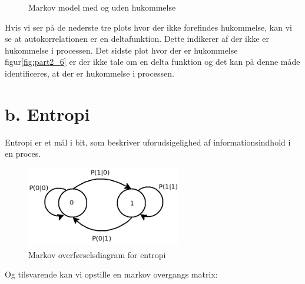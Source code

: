  \begin{figure}[!h]
	\centering
	\caption{Markov model med og uden hukommelse }
	\label{fig:part2_markov}
\end{figure}
Hvis vi ser på de nederste tre plots hvor der ikke forefindes hukommelse, kan vi se at autokorrelationen er en deltafunktion. Dette indikerer af der ikke er hukommelse i processen. Det sidste plot hvor der er hukommelse figur\ref{fig:part2_6} er der ikke tale om en delta funktion og det kan på denne måde identificeres, at der er hukommelse i processen. 


\section{b. Entropi }
Entropi er et mål i bit, som beskriver uforudsigelighed af informationsindhold i en proces.

 \begin{figure}[!h]
	\centering
	\includegraphics[width=0.6\textwidth]{resources/part2_entropi_diagram}
	\caption{Markov overførselsdiagram for entropi }
	\label{fig:part2_7}
\end{figure}
Og tilsvarende kan vi opstille en markov overgangs matrix:


